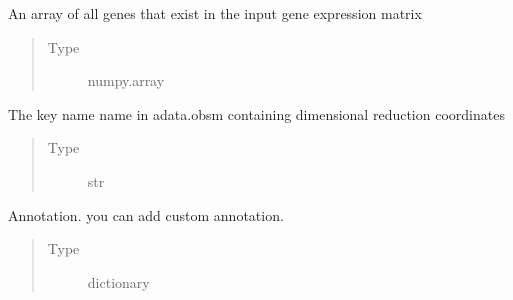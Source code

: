 \documentclass[letterpaper,10pt,english]{sphinxmanual}
\begin{document}
\begin{fulllineitems}
\begin{fulllineitems}
\begin{quote}
\begin{description}
\end{description}\end{quote}

\end{fulllineitems}


\begin{fulllineitems}
\label{\detokenize{modules/celloracle:celloracle.Net.all_genes}}
An array of all genes that exist in the input gene expression matrix
\begin{quote}\begin{description}
\item[{Type}] \leavevmode
numpy.array

\end{description}\end{quote}

\end{fulllineitems}


\begin{fulllineitems}
\label{\detokenize{modules/celloracle:celloracle.Net.embedding_name}}
The key name name in adata.obsm containing dimensional reduction coordinates
\begin{quote}\begin{description}
\item[{Type}] \leavevmode
str

\end{description}\end{quote}

\end{fulllineitems}


\begin{fulllineitems}
\label{\detokenize{modules/celloracle:celloracle.Net.annotation}}
Annotation. you can add custom annotation.
\begin{quote}\begin{description}
\item[{Type}] \leavevmode
dictionary


\end{description}
\end{quote}
\end{fulllineitems}
\end{fulllineitems}
\end{document}
